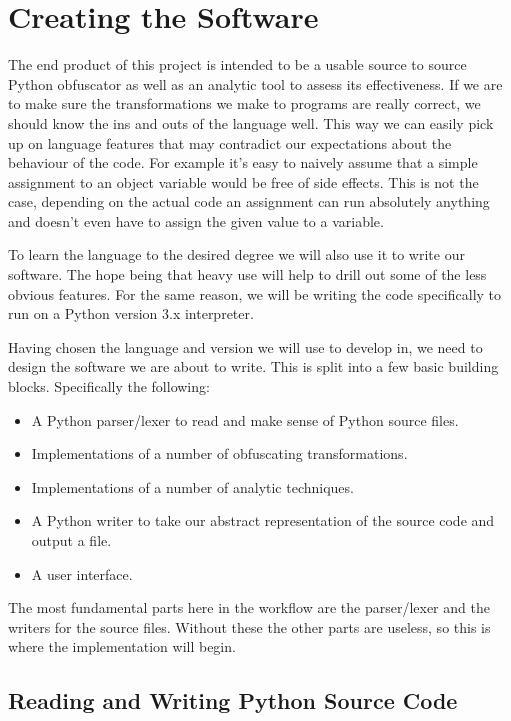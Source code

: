 \documentclass[twoside,a4paper]{report}
\begin{document}
\section{Creating the Software}

The end product of this project is intended to be a usable source to source Python obfuscator as well as an analytic tool
to assess its effectiveness. If we are to make sure the transformations we make to programs are really correct, we should
know the ins and outs of the language well. This way we can easily pick up on language features that may contradict our
expectations about the behaviour of the code. For example it's easy to naively assume that a simple assignment to an object
variable would be free of side effects. This is not the case, depending on the actual code an assignment can run absolutely
anything \cite{pyprop} and doesn't even have to assign the given value to a variable.

To learn the language to the desired degree we will also use it to write our software. The hope being that heavy use will help to
drill out some of the less obvious features. For the same reason, we will be writing the code specifically to run on a Python version 3.x
interpreter.

Having chosen the language and version we will use to develop in, we need to design the software we are about to write. This is split into a few basic building
blocks. Specifically the following:

\begin{itemize}
\item A Python parser/lexer to read and make sense of Python source files.
\item Implementations of a number of obfuscating transformations.
\item Implementations of a number of analytic techniques.
\item A Python writer to take our abstract representation of the source code and output a file.
\item A user interface.
\end{itemize}

The most fundamental parts here in the workflow are the parser/lexer and the writers for the source files.
Without these the other parts are useless, so this is where the implementation will begin.

\subsection{Reading and Writing Python Source Code}
\end{document}
